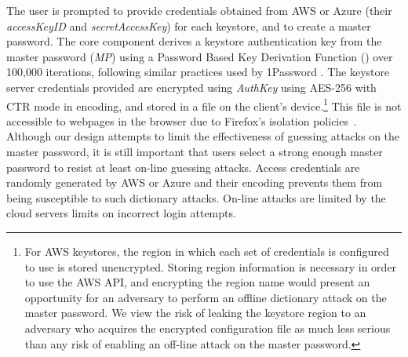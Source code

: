 
The user is prompted to provide credentials obtained from AWS or Azure (their \emph{accessKeyID} and \emph{secretAccessKey}) for each keystore, and to create a master password. The core component derives a keystore authentication key from the master password (\emph{MP}) using a Password Based Key Derivation Function () over 100,000 iterations, following similar practices used by 1Password \cite{1PasswordWhitePaper}.
The keystore server credentials provided are encrypted using \emph{AuthKey} using AES-256 with CTR mode in  encoding, and stored in a  file on the client's device.\footnote{For AWS keystores, the region in which each set of credentials is configured to use is stored unencrypted. Storing region information is necessary in order to use the AWS API, and encrypting the region name would present an opportunity for an adversary to perform an offline dictionary attack on the master password.  We view the risk of leaking the keystore region to an adversary who acquires the encrypted configuration file as much less serious than any risk of enabling an off-line attack on the master password.} This file is not accessible to webpages in the browser due to Firefox's isolation policies~\cite{firefoxAPI}.  Although our design attempts to limit the effectiveness of guessing attacks on the master password, it is still important that users select a strong enough master password to resist at least on-line guessing attacks. Access credentials are randomly generated by AWS or Azure and their  encoding prevents them from being susceptible to such dictionary attacks. On-line attacks are limited by the cloud servers limits on incorrect login attempts.

 



